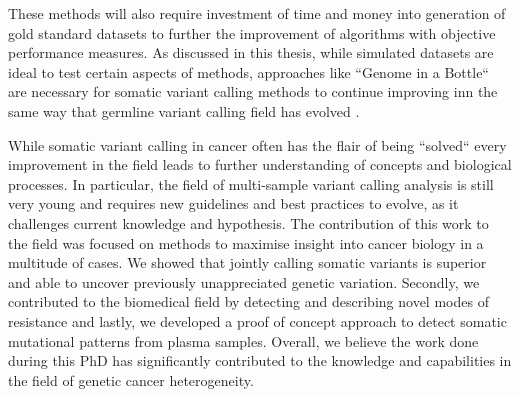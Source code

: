 These methods will also require investment of time and money into generation of gold standard datasets to further the improvement of algorithms with objective performance measures. As discussed in this thesis, while simulated datasets are ideal to test certain aspects of methods, approaches like ``Genome in a Bottle`` are necessary for somatic variant calling methods to continue improving inn the same way that germline variant calling field has evolved \cite{ValleInclan2022}.

While somatic variant calling in cancer often has the flair of being ``solved`` every improvement in the field leads to further understanding of concepts and biological processes. In particular, the field of multi-sample variant calling analysis is still very young and requires new guidelines and best practices to evolve, as it challenges current knowledge and hypothesis. The contribution of this work to the field was focused on methods to maximise insight into cancer biology in a multitude of cases. We showed that jointly calling somatic variants is superior and able to uncover previously unappreciated genetic variation. Secondly, we contributed to the biomedical field by detecting and describing novel modes of resistance and lastly, we developed a proof of concept approach to detect somatic mutational patterns from plasma samples. Overall, we believe the work done during this PhD has significantly contributed to the knowledge and capabilities in the field of genetic cancer heterogeneity.

